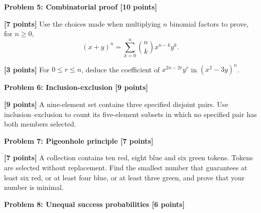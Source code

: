 \documentclass[12pt,letterpaper]{article}
\newcommand{\problemheading}[2][5\baselineskip]{\Needspace{#1}\par\noindent\hspace*{-0.625in}\textbf{#2}\par\nobreak\vspace{0.3em}}
\newcommand{\examspace}[1]{\par\vspace*{#1cm}}
\begin{document}
\problemheading{Problem 5: Combinatorial proof [10 points]}
\begin{list}{}{\setlength{\leftmargin}{0.25in}\setlength{\rightmargin}{0.25in}}\item[]
\begin{description}[font=\normalfont,leftmargin=1.2em,labelsep=0.4em]
\item[(a)] \textbf{[7 points]} Use the choices made when multiplying $n$ binomial factors to prove, for $n\ge0$,\[(x+y)^n=\sum_{k=0}^{n}\binom nk x^{n-k}y^k.\]
\examspace{5}
\Needspace{\dimexpr 3cm+4\baselineskip\relax}
\item[(b)] \textbf{[3 points]} For $0\le r\le n$, deduce the coefficient of $x^{2n-2r}y^r$ in $(x^2-3y)^n$.
\examspace{3}
\end{description}
\end{list}
\clearpage
\vspace*{0.21in}
\problemheading{Problem 6: Inclusion-exclusion [9 points]}
\begin{list}{}{\setlength{\leftmargin}{0.25in}\setlength{\rightmargin}{0.25in}}\item[]
\begin{description}[font=\normalfont,leftmargin=1.2em,labelsep=0.4em]
\item[] \textbf{[9 points]} A nine-element set contains three specified disjoint pairs. Use inclusion--exclusion to count its five-element subsets in which no specified pair has both members selected.
\examspace{7}
\end{description}
\end{list}
\clearpage
\vspace*{0.21in}
\problemheading{Problem 7: Pigeonhole principle [7 points]}
\begin{list}{}{\setlength{\leftmargin}{0.25in}\setlength{\rightmargin}{0.25in}}\item[]
\begin{description}[font=\normalfont,leftmargin=1.2em,labelsep=0.4em]
\item[] \textbf{[7 points]} A collection contains ten red, eight blue and six green tokens. Tokens are selected without replacement. Find the smallest number that guarantees at least six red, or at least four blue, or at least three green, and prove that your number is minimal.
\examspace{7}
\end{description}
\end{list}
\clearpage
\vspace*{0.21in}
\problemheading{Problem 8: Unequal success probabilities [6 points]}
\end{document}
